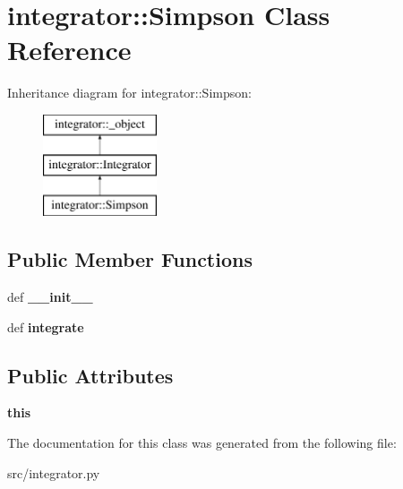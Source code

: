 \hypertarget{classintegrator_1_1Simpson}{
\section{integrator::Simpson Class Reference}
\label{d0/d4a/classintegrator_1_1Simpson}
}
Inheritance diagram for integrator::Simpson:\begin{figure}[H]
\begin{center}
\leavevmode
\includegraphics[height=3cm]{d0/d4a/classintegrator_1_1Simpson}
\end{center}
\end{figure}
\subsection*{Public Member Functions}
\begin{DoxyCompactItemize}
\item 
\hypertarget{classintegrator_1_1Simpson_a17d1008804885fc6afe3790365ffa9e7}{
def {\bfseries \_\-\_\-init\_\-\_\-}}
\label{d0/d4a/classintegrator_1_1Simpson_a17d1008804885fc6afe3790365ffa9e7}

\item 
\hypertarget{classintegrator_1_1Simpson_a8af6b307046196ddefc88456f2341b16}{
def {\bfseries integrate}}
\label{d0/d4a/classintegrator_1_1Simpson_a8af6b307046196ddefc88456f2341b16}

\end{DoxyCompactItemize}
\subsection*{Public Attributes}
\begin{DoxyCompactItemize}
\item 
\hypertarget{classintegrator_1_1Simpson_a891a4cebf60a703f96f1bbd8d1add1e2}{
{\bfseries this}}
\label{d0/d4a/classintegrator_1_1Simpson_a891a4cebf60a703f96f1bbd8d1add1e2}

\end{DoxyCompactItemize}


The documentation for this class was generated from the following file:\begin{DoxyCompactItemize}
\item 
src/integrator.py\end{DoxyCompactItemize}
